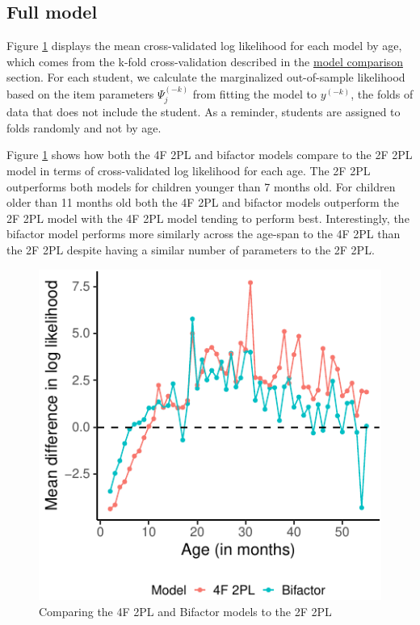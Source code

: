 \documentclass[10pt, letterpaper]{article}
\newenvironment{CodeChunk}{}{}
\begin{document}
\hypertarget{full}{%
\subsection{Full model}\label{full}}

Figure \ref{fig:byage} displays the mean cross-validated log likelihood
for each model by age, which comes from the k-fold cross-validation
described in the \protect\hyperlink{modelcompare}{model comparison}
section. For each student, we calculate the marginalized out-of-sample
likelihood based on the item parameters \(\Psi_j^{(-k)}\) from fitting
the model to \(y^{(-k)}\), the folds of data that does not include the
student. As a reminder, students are assigned to folds randomly and not
by age.

Figure \ref{fig:byage} shows how both the 4F 2PL and bifactor models
compare to the 2F 2PL model in terms of cross-validated log likelihood
for each age. The 2F 2PL outperforms both models for children younger
than 7 months old. For children older than 11 months old both the 4F 2PL
and bifactor models outperform the 2F 2PL model with the 4F 2PL model
tending to perform best. Interestingly, the bifactor model performs more
similarly across the age-span to the 4F 2PL than the 2F 2PL despite
having a similar number of parameters to the 2F 2PL.

\begin{CodeChunk}
\begin{figure}[tb]
\includegraphics{figs/byage-1} \caption[Comparing the 4F 2PL and Bifactor models to the 2F 2PL]{Comparing the 4F 2PL and Bifactor models to the 2F 2PL}\label{fig:byage}
\end{figure}
\end{CodeChunk}
\end{document}

